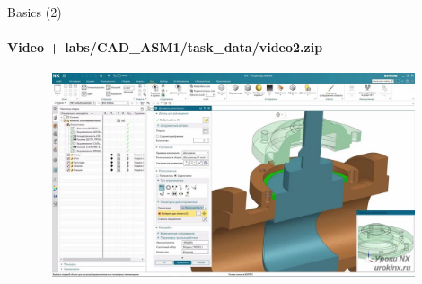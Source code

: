 \documentclass[aspectratio=169]{beamer}
\newcommand{\fbckg}[1]{\usebackgroundtemplate{\texttt{[image: \#1]}}}%
\begin{document}
    \begin{frame}[t]{Basics (2)}
        \framesubtitle{Video + labs/CAD\_ASM1/task\_data/video2.zip}
        \vspace{-0.6cm}
        \begin{figure}[H]
            \href{https://disk.yandex.ru/i/kbz5Hqkpsvte8w}{
                \centering\includegraphics[height=6cm,width=1\textwidth,keepaspectratio]{2.png}}
            \label{fig:2}
        \end{figure}
    \end{frame}

\fbckg{fibeamer/figs/last_page.png}
\frame[plain]{}
\end{document}

